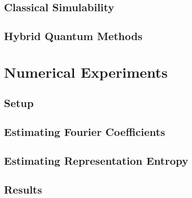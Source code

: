 \documentclass[11pt]{article}
\begin{document}

\subsection{Classical Simulability}


\subsection{Hybrid Quantum Methods}


\section{Numerical Experiments}

\subsection{Setup}


\subsection{Estimating Fourier Coefficients}


\subsection{Estimating Representation Entropy}


\subsection{Results}


\end{document}
